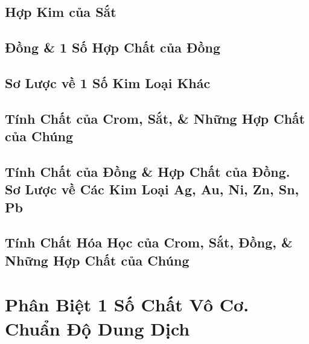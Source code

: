 \documentclass{article}
\numberwithin{equation}{section}
\begin{document}

\subsection{Hợp Kim của Sắt}


\subsection{Đồng \& 1 Số Hợp Chất của Đồng}


\subsection{Sơ Lược về 1 Số Kim Loại Khác}


\subsection{Tính Chất của Crom, Sắt, \& Những Hợp Chất của Chúng}


\subsection{Tính Chất của Đồng \& Hợp Chất của Đồng. Sơ Lược về Các Kim Loại Ag, Au, Ni, Zn, Sn, Pb}


\subsection{Tính Chất Hóa Học của Crom, Sắt, Đồng, \& Những Hợp Chất của Chúng}


\section{Phân Biệt 1 Số Chất Vô Cơ. Chuẩn Độ Dung Dịch}
\end{document}
